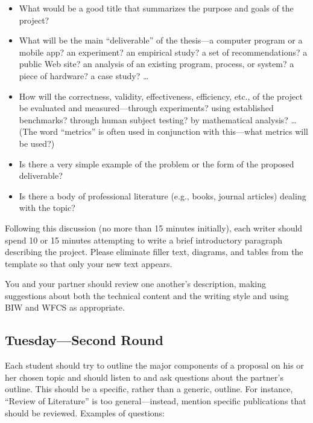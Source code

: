 \begin{itemize}
\item
What would be a good title that summarizes the purpose and goals of the project?
\item
What will be the main ``deliverable'' of the thesis---a computer program or
a mobile app? an
experiment? an empirical study? a set of recommendations? a
public Web site? an analysis of an existing program, process, or system?
a piece of hardware? a case study? \ldots
\item
How will the correctness, validity, effectiveness, efficiency, etc., of the
project be
evaluated and measured---through experiments? using established benchmarks?
through human subject testing? by mathematical analysis? \ldots (The word
``metrics'' is often used in conjunction with this---what
metrics will be used?)
\item
Is there a very simple example of the problem or the form
of the proposed deliverable?
\item
Is there a body of professional literature (e.g., books, journal articles)
dealing with the topic?
\end{itemize}

Following this discussion (no more than 15 minutes initially), each writer
should spend 10 or 15 minutes attempting to write a brief introductory
paragraph describing the project.
Please eliminate filler text, diagrams, and tables from the
template so that only your new text appears.

 You and your partner should review one another's description, making suggestions about both the
technical content and the writing style and using BIW and WFCS as appropriate.

\subsection*{Tuesday---Second Round}

 Each student should try to outline the major
components of a proposal on his or her chosen topic and should listen to
and ask questions about the partner's outline. This should be a
specific, rather than a generic, outline. For instance, ``Review of
Literature'' is too general---instead, mention specific publications
that should be reviewed. Examples of questions:


